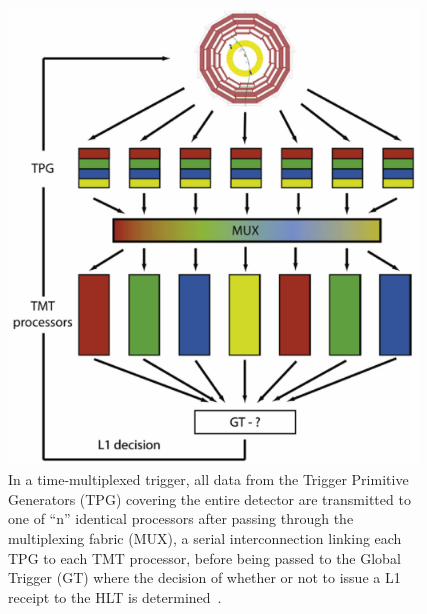 \begin{figure}[htbp]
\begin{center}
\includegraphics[width=0.97\textwidth]{figs/cms/TMT.pdf}
\caption{In a time-multiplexed trigger, all data from the Trigger Primitive Generators (TPG) covering the entire detector are transmitted to one of ``n'' identical processors after passing through the multiplexing fabric (MUX), a serial interconnection linking each TPG to each TMT processor, before being passed to the Global Trigger (GT) where the decision of whether or not to issue a L1 receipt to the HLT is determined~\cite{tmttelba}.}
\label{fig:TMT}
\end{center}
\end{figure}

